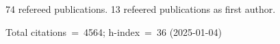 74 refereed publications. 13 refeered publications as first author.

Total citations~=~4564; h-index~=~36 (2025-01-04)